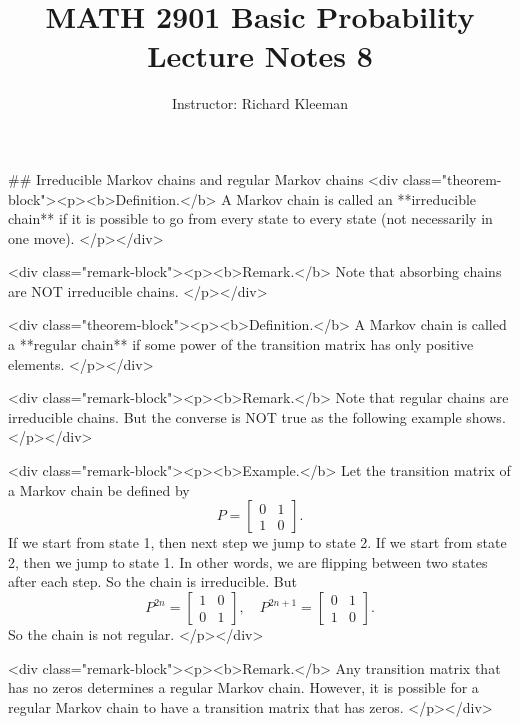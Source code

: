 


\title{MATH 2901 Basic Probability Lecture Notes 8}
\author{Instructor: Richard Kleeman}
\date{}
\maketitle


## Irreducible Markov chains and regular Markov chains
<div class="theorem-block"><p><b>Definition.</b> 
A Markov chain is called an **irreducible chain** if it is possible to go from every state to every state (not necessarily in one move).
</p></div>

<div class="remark-block"><p><b>Remark.</b> 
Note that absorbing chains are NOT irreducible chains.
</p></div>

<div class="theorem-block"><p><b>Definition.</b> 
A Markov chain is called a **regular chain** if some power of the transition matrix has only positive elements. 
</p></div>

<div class="remark-block"><p><b>Remark.</b> 
Note that regular chains are irreducible chains. But the converse is NOT true as the following example shows.
</p></div>

<div class="remark-block"><p><b>Example.</b> 
Let the transition matrix of a Markov chain be defined by
$$\begin{equation}
    P = \begin{bmatrix} 0 & 1 \\ 1 & 0 \end{bmatrix}.
\end{equation}$$
If we start from state 1, then next step we jump to state 2. If we start from state 2, then we jump to state 1. In other words, we are flipping between two states after each step. So the chain is irreducible. But 
$$\begin{equation}
    P^{2n} = \begin{bmatrix} 1 & 0 \\ 0 & 1 \end{bmatrix}, \quad 
    P^{2n+1} = \begin{bmatrix} 0 & 1 \\ 1 & 0 \end{bmatrix}.
\end{equation}$$
So the chain is not regular.
</p></div>

<div class="remark-block"><p><b>Remark.</b> 
Any transition matrix that has no zeros determines a regular Markov chain. However, it is possible for a regular Markov chain to have a transition matrix that has zeros.
</p></div>

